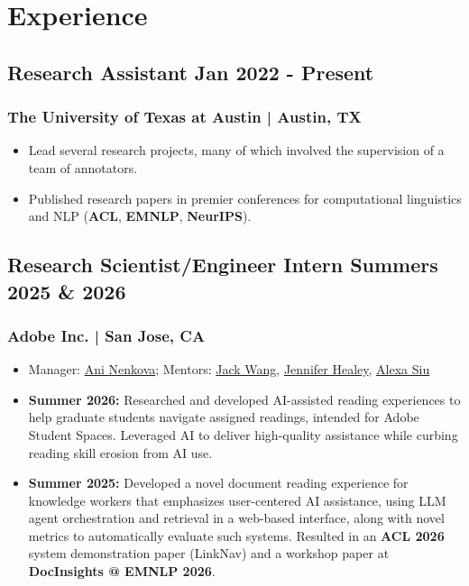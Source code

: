 \documentclass[11pt]{article}
\begin{document}
\section{Experience}
\subsection{Research Assistant \hfill \normalfont Jan 2022 - Present}
\subsubsection{The University of Texas at Austin | Austin, TX}
\begin{itemize}
    \item Lead several research projects, many of which involved the supervision of a team of annotators.
    \item Published research papers in premier conferences for computational linguistics and NLP (\textbf{ACL}, \textbf{EMNLP}, \textbf{NeurIPS}).
\end{itemize}

\subsection{Research Scientist/Engineer Intern \hfill \normalfont Summers 2025 \& 2026}
\subsubsection{Adobe Inc. | San Jose, CA}

\begin{itemize}
    \item Manager: \href{https://research.adobe.com/person/ani-nenkova/}{Ani Nenkova}; Mentors: \href{https://zichaow.github.io/}{Jack Wang}, \href{https://research.adobe.com/person/jennifer-healey/}{Jennifer Healey}, \href{https://research.adobe.com/person/alexa-siu/}{Alexa Siu}
    \item \textbf{Summer 2026:} Researched and developed AI-assisted reading experiences to help graduate students navigate assigned readings, intended for Adobe Student Spaces. Leveraged AI to deliver high-quality assistance while curbing reading skill erosion from AI use.
    \item \textbf{Summer 2025:} Developed a novel document reading experience for knowledge workers that emphasizes user-centered AI assistance, using LLM agent orchestration and retrieval in a web-based interface, along with novel metrics to automatically evaluate such systems. Resulted in an \textbf{ACL 2026} system demonstration paper (LinkNav) and a workshop paper at \textbf{DocInsights @ EMNLP 2026}.
\end{itemize}
\end{document}

